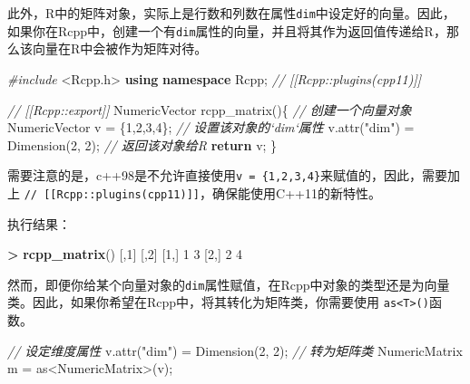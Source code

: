 \documentclass[]{ctexbook}
\newenvironment{Shaded}{\begin{snugshade}}{\end{snugshade}}
\newcommand{\KeywordTok}[1]{\textcolor[rgb]{0.13,0.29,0.53}{\textbf{#1}}}
\newcommand{\DecValTok}[1]{\textcolor[rgb]{0.00,0.00,0.81}{#1}}
\newcommand{\StringTok}[1]{\textcolor[rgb]{0.31,0.60,0.02}{#1}}
\newcommand{\ImportTok}[1]{#1}
\newcommand{\CommentTok}[1]{\textcolor[rgb]{0.56,0.35,0.01}{\textit{#1}}}
\newcommand{\ControlFlowTok}[1]{\textcolor[rgb]{0.13,0.29,0.53}{\textbf{#1}}}
\newcommand{\OperatorTok}[1]{\textcolor[rgb]{0.81,0.36,0.00}{\textbf{#1}}}
\newcommand{\PreprocessorTok}[1]{\textcolor[rgb]{0.56,0.35,0.01}{\textit{#1}}}
\newcommand{\NormalTok}[1]{#1}
\begin{document}
此外，R中的矩阵对象，实际上是行数和列数在属性\texttt{dim}中设定好的向量。因此，如果你在Rcpp中，创建一个有\texttt{dim}属性的向量，并且将其作为返回值传递给R，那么该向量在R中会被作为矩阵对待。

\begin{Shaded}
\begin{Highlighting}[]
\PreprocessorTok{#include }\ImportTok{<Rcpp.h>}
\KeywordTok{using} \KeywordTok{namespace}\NormalTok{ Rcpp;}
\CommentTok{// [[Rcpp::plugins(cpp11)]]}

\CommentTok{// [[Rcpp::export]]}
\NormalTok{NumericVector rcpp_matrix()\{}
    \CommentTok{// 创建一个向量对象}
\NormalTok{    NumericVector v = \{}\DecValTok{1}\NormalTok{,}\DecValTok{2}\NormalTok{,}\DecValTok{3}\NormalTok{,}\DecValTok{4}\NormalTok{\};}
    \CommentTok{// 设置该对象的`dim`属性}
\NormalTok{    v.attr(}\StringTok{"dim"}\NormalTok{) = Dimension(}\DecValTok{2}\NormalTok{, }\DecValTok{2}\NormalTok{);}
    \CommentTok{// 返回该对象给R}
    \ControlFlowTok{return}\NormalTok{ v;}
\NormalTok{\}}
\end{Highlighting}
\end{Shaded}

需要注意的是，c++98是不允许直接使用\texttt{v\ =\ \{1,2,3,4\}}来赋值的，因此，需要加上
\texttt{//\ {[}{[}Rcpp::plugins(cpp11){]}{]}}，确保能使用C++11的新特性。

执行结果：

\begin{Shaded}
\begin{Highlighting}[]
\OperatorTok{>}\StringTok{ }\KeywordTok{rcpp_matrix}\NormalTok{()}
\NormalTok{     [,}\DecValTok{1}\NormalTok{] [,}\DecValTok{2}\NormalTok{]}
\NormalTok{[}\DecValTok{1}\NormalTok{,]    }\DecValTok{1}    \DecValTok{3}
\NormalTok{[}\DecValTok{2}\NormalTok{,]    }\DecValTok{2}    \DecValTok{4}
\end{Highlighting}
\end{Shaded}

然而，即便你给某个向量对象的\texttt{dim}属性赋值，在Rcpp中对象的类型还是为向量类。因此，如果你希望在Rcpp中，将其转化为矩阵类，你需要使用
\texttt{as\textless{}T\textgreater{}()}函数。

\begin{Shaded}
\begin{Highlighting}[]
\CommentTok{// 设定维度属性}
\NormalTok{v.attr(}\StringTok{"dim"}\NormalTok{) = Dimension(}\DecValTok{2}\NormalTok{, }\DecValTok{2}\NormalTok{);}
\CommentTok{// 转为矩阵类}
\NormalTok{NumericMatrix m = as<NumericMatrix>(v);}
\end{Highlighting}
\end{Shaded}
\end{document}
